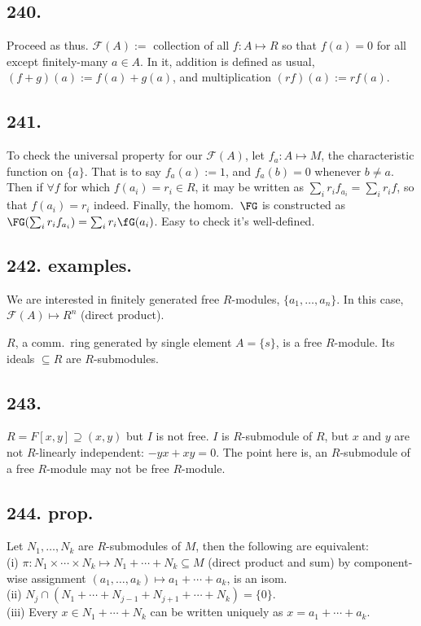 \documentclass[12pt]{article}
\newcommand{\X}\times%
\newcommand{\Ev}\forall%
\newcommand{\Mp}\mapsto%
\newcommand{\CF}[1]{ \mathcal{#1} }%
\begin{document}
\subsection*{240.} Proceed as thus. 
\(\CF{F}(A) :=\) collection of all \(f: A \Mp R\) so that \(f(a) =0\) for all except finitely-many \(a \in A\). 
In it, addition is defined as usual, \((f+g)(a) := f(a) +g(a)\), and multiplication \((rf)(a) := rf(a)\). 

\subsection*{241.} To check the universal property for our \(\CF{F}(A)\), let \(f_a: A \Mp M\), the characteristic function on \(\{a\}\). 
That is to say \(f_a(a) :=1\), and \(f_a(b) =0\) whenever \(b \neq a\). 
Then if \(\Ev f\) for which \(f(a_i) =r_i \in R\), it may be written as \(\sum_i r_i f_{a_i} =\sum_i r_i f\), so that \(f(a_i) =r_i\) indeed. 
Finally, the homom.\ \(\FG\) is constructed as \(\FG(\sum_i r_i f_{a_i}) =\sum_i r_i \fG(a_i)\). Easy to check it's well-defined. 

\subsection*{242. examples.} We are interested in finitely generated free \(R\)-modules, \(\{a_1,\dotsc,a_n\}\). 
In this case, \(\CF{F}(A) \Mp R^n\) (direct product). \par
\(R\), a comm.\ ring generated by single element \(A =\{s\}\), is a free \(R\)-module. 
Its ideals \(\subseteq R\) are \(R\)-submodules. 

\subsection*{243.} \(R =F[x,y] \supseteq (x,y)\) but \(I\) is not free. 
\(I\) is \(R\)-submodule of \(R\), but \(x\) and \(y\) are not \(R\)-linearly independent: \(-yx +xy =0\). 
The point here is, an \(R\)-submodule of a free \(R\)-module may not be free \(R\)-module. 

\subsection*{244. prop.} Let \(N_1,\dotsc,N_k\) are \(R\)-submodules of \(M\), then the following are equivalent: \\
\indent (i) \(\pi: N_1\X\dotsb\X N_k \Mp N_1 +\dotsb+ N_k \subseteq M\) (direct product and sum) by component-wise assignment \((a_1,\dotsc,a_k) \Mp a_1 +\dotsb+ a_k\), is an isom. \\
\indent (ii) \(N_j \cap (N_1 +\dotsb+ N_{j-1} +N_{j+1} +\dotsb+ N_k) =\{0\}\). \\
\indent (iii) Every \(x \in N_1 +\dotsb+ N_k\) can be written uniquely as \(x =a_1 +\dotsb+ a_k\). 
\end{document}
